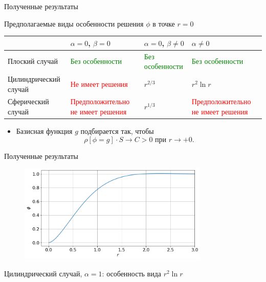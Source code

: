 \begin{frame}{Полученные результаты}
\vspace{-0.3cm}
\begin{center}
	Предполагаемые виды особенности решения $\phi$ в точке $r = 0$
\end{center}
\begin{tabular}{|m{3cm}||m{3.5cm}|m{3.5cm}|m{3.5cm}|}
	\hline
	\vspace*{2mm} \hfill \vspace*{2mm} &\centering $\alpha = 0$, $\beta = 0$ &
	\centering $\alpha = 0$, $\beta \neq 0$ & \centering \arraybackslash $\alpha \neq 0$ \\
	\hline
	\hline
	\vspace{2mm} Плоский \linebreak случай \vspace{2mm} &
	\textcolor{green}{Без особенности} & \textcolor{green}{Без особенности} & \textcolor{green}{Без особенности} \\
	\hline
	\vspace{2mm} Цилиндрический \linebreak случай \vspace{2mm} &
	\textcolor{red}{Не имеет решения} & $r^{2/3}$ & $r^2 \ln r$ \\
	\hline
	\vspace{2mm} Сферический \linebreak случай \vspace{2mm} &
	\textcolor{red}{Предположительно не имеет решения} & $r^{1/3}$ & \textcolor{red}{Предположительно не имеет решения} \\
	\hline
\end{tabular}
\begin{itemize}
	\item Базисная функция $g$ подбирается так, чтобы
	\vspace{-0.2cm}
	$$\rho[\phi = g] \cdot S \to C > 0 \text{ при } r \to +0.$$
\end{itemize}
\end{frame}


\begin{frame}{Полученные результаты}
\vspace{-0.5cm}
\begin{figure}
	\includegraphics[width=0.81\textwidth]{figures/result_volumes_cyl_bi.png}
\end{figure}
\vspace{-0.7cm}
\begin{center}
	Цилиндрический случай, $\alpha = 1$: особенность вида $r^2 \ln r$
\end{center}
\end{frame}


